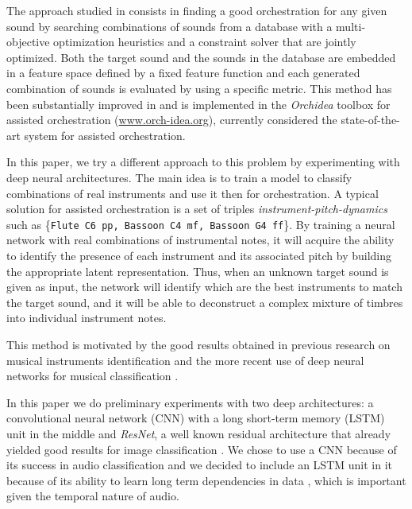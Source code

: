 \documentclass{article}
\begin{document}
The approach studied in \cite{Carpentier2010} consists in finding a good orchestration for any given sound by searching combinations of sounds from a database with a multi-objective optimization heuristics and a constraint solver that are jointly optimized. Both the target sound and the sounds in the database are embedded in a feature space defined by a fixed feature function and each generated combination of sounds is evaluated by using a specific metric. This method has been substantially improved in \cite{Cella18, Cella2020} and is implemented in the \emph{Orchidea} toolbox for assisted orchestration (\url{www.orch-idea.org}), currently considered the state-of-the-art system for assisted orchestration.

In this paper, we try a different approach to this problem by experimenting with deep neural architectures. The main idea is to train a model to classify combinations of real instruments and use it then for orchestration. A typical solution for assisted orchestration is a set of triples \emph{instrument-pitch-dynamics} such as \{\texttt{Flute C6 pp, Bassoon C4 mf, Bassoon G4 ff}\}. By training a neural network with real combinations of instrumental notes, it will acquire the ability to identify the presence of each instrument and its associated pitch by building the appropriate latent representation. Thus, when an unknown target sound is given as input, the network will identify which are the best instruments to match the target sound, and it will be able to  deconstruct a complex mixture of timbres into individual instrument notes.


This method is motivated by the good results obtained in previous research on musical instruments identification \cite{Benetos07, Kitahara05} and the more recent use of deep neural networks for musical classification \cite{lostanlen16, Bian19}. 

In this paper we do preliminary experiments with two deep architectures: a convolutional neural network (CNN) with a long short-term memory (LSTM) unit in the middle and \emph{ResNet}, a well known residual architecture that already yielded good results for image classification \cite{He15}. We chose to use a CNN because of its success in audio classification \cite{Hershey17} and we decided to include an LSTM unit in it because of its ability to learn long term dependencies in data \cite{Hochreiter97}, which is important given the temporal nature of audio.
\end{document}
